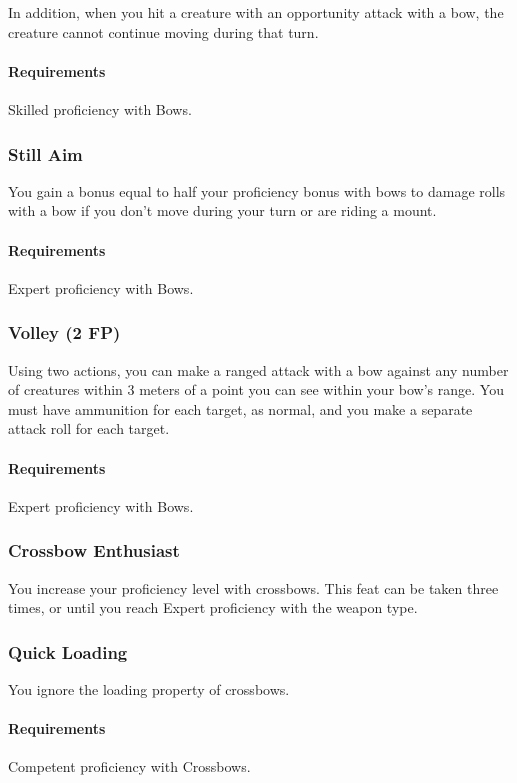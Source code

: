     In addition, when you hit a creature with an opportunity attack with a bow, the creature cannot continue moving during that turn.
    \paragraph{Requirements} Skilled proficiency with Bows.
\subsubsection{Still Aim} \label{feat::stillaim}
    You gain a bonus equal to half your proficiency bonus with bows to damage rolls with a bow if you don't move during your turn or are riding a mount.
    \paragraph{Requirements} Expert proficiency with Bows.
\subsubsection{Volley (2 FP)} \label{feat::volley}
    Using two actions, you can make a ranged attack with a bow against any number of creatures within 3 meters of a point you can see within your bow's range.
    You must have ammunition for each target, as normal, and you make a separate attack roll for each target.
    \paragraph{Requirements} Expert proficiency with Bows.
\subsubsection{Crossbow Enthusiast} \label{feat::crossbowenthusiast}
    You increase your proficiency level with crossbows.
    This feat can be taken three times, or until you reach Expert proficiency with the weapon type.
\subsubsection{Quick Loading} \label{feat::quickloading}
    You ignore the loading property of crossbows.
    \paragraph{Requirements} Competent proficiency with Crossbows.
